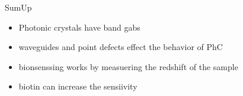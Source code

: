 \begin{frame}{SumUp}
  \begin{itemize}
    \setlength\itemsep{1.2em}
    \item{Photonic crystals have band gabs}
    \item{waveguides and point defects effect the behavior of PhC}
    \item{bionsenssing works by measuering the redshift of the sample }
    \item{biotin can increase the sensiivity}
  \end{itemize}
\end{frame}

\begin{frame}
  \nocite{*}
  \printbibliography
\end{frame}


